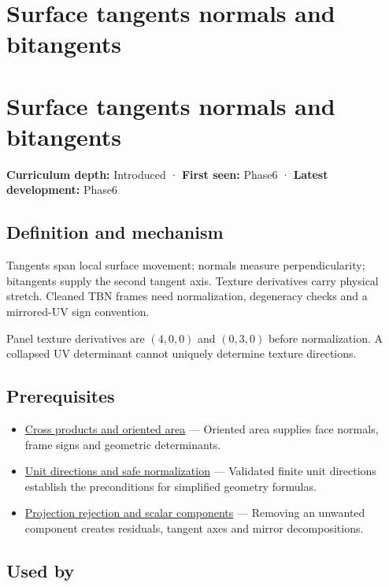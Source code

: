 \hypertarget{appendix-e31893dec985}{}
\section*{Surface tangents normals and bitangents}
\section{Surface tangents normals and bitangents}\label{surface-tangents-normals-and-bitangents}

\textbf{Curriculum depth:} Introduced · \textbf{First seen:} Phase6 · \textbf{Latest development:} Phase6

\subsection{Definition and mechanism}\label{definition-and-mechanism}

Tangents span local surface movement; normals measure perpendicularity; bitangents supply the second tangent axis. Texture derivatives carry physical stretch. Cleaned TBN frames need normalization, degeneracy checks and a mirrored-UV sign convention.

Panel texture derivatives are \((4,0,0)\) and \((0,3,0)\) before normalization. A collapsed UV determinant cannot uniquely determine texture directions.

\subsection{Prerequisites}\label{prerequisites}

\begin{itemize}
\tightlist
\item
  \hyperref[appendix-2391db8052b1]{Cross products and oriented area} --- Oriented area supplies face normals, frame signs and geometric determinants.
\item
  \hyperref[appendix-f744e41b95b4]{Unit directions and safe normalization} --- Validated finite unit directions establish the preconditions for simplified geometry formulas.
\item
  \hyperref[appendix-505a502c372a]{Projection rejection and scalar components} --- Removing an unwanted component creates residuals, tangent axes and mirror decompositions.
\end{itemize}

\subsection{Used by}\label{used-by}


